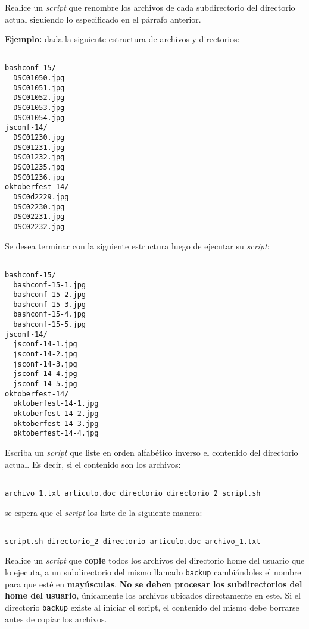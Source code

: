 \begin{questions}
  Realice un \textit{script} que renombre los archivos de cada subdirectorio del directorio actual
  siguiendo lo especificado en el párrafo anterior.

  \textbf{Ejemplo:} dada la siguiente estructura de archivos y directorios:

  \begin{lstlisting}

bashconf-15/
  DSC01050.jpg
  DSC01051.jpg
  DSC01052.jpg
  DSC01053.jpg
  DSC01054.jpg
jsconf-14/
  DSC01230.jpg
  DSC01231.jpg
  DSC01232.jpg
  DSC01235.jpg
  DSC01236.jpg
oktoberfest-14/
  DSC0d2229.jpg
  DSC02230.jpg
  DSC02231.jpg
  DSC02232.jpg

  \end{lstlisting}

  Se desea terminar con la siguiente estructura luego de ejecutar su \textit{script}:

  \begin{lstlisting}

bashconf-15/
  bashconf-15-1.jpg
  bashconf-15-2.jpg
  bashconf-15-3.jpg
  bashconf-15-4.jpg
  bashconf-15-5.jpg
jsconf-14/
  jsconf-14-1.jpg
  jsconf-14-2.jpg
  jsconf-14-3.jpg
  jsconf-14-4.jpg
  jsconf-14-5.jpg
oktoberfest-14/
  oktoberfest-14-1.jpg
  oktoberfest-14-2.jpg
  oktoberfest-14-3.jpg
  oktoberfest-14-4.jpg

  \end{lstlisting}

\question Escriba un \textit{script} que liste en orden alfabético inverso el contenido
  del directorio actual. Es decir, si el contenido son los archivos:

  \begin{lstlisting}

archivo_1.txt articulo.doc directorio directorio_2 script.sh

  \end{lstlisting}

  se espera que el \textit{script} los liste de la siguiente manera:

  \begin{lstlisting}

script.sh directorio_2 directorio articulo.doc archivo_1.txt

  \end{lstlisting}

\question Realice un \textit{script} que \textbf{copie} todos los archivos del directorio home
  del usuario que lo ejecuta, a un subdirectorio del mismo llamado \texttt{backup} cambiándoles
  el nombre para que esté en \textbf{mayúsculas}. \textbf{No se deben procesar los subdirectorios
  del home del usuario}, únicamente los archivos ubicados directamente en este. Si el directorio
  \texttt{backup} existe al iniciar el script, el contenido del mismo debe borrarse antes de
  copiar los archivos.


\end{questions}
